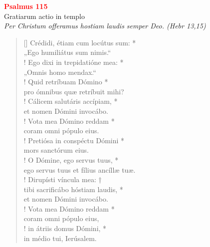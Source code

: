 
\def\greinitialformat#1{%
{\fontsize{39}{39}\selectfont #1}%
}




\vspace{0.3cm}
\begin{center}
 \textcolor{red}{\large \bf Psalmus 115}\\
Gratiarum actio in templo\\
\textit{\small Per Christum offeramus hostiam laudis semper Deo. (Hebr 13,15)}
\end{center}
\begin{verse}[\versewidth]
\vin  Crédidi, étiam cum locútus sum: *\\
\vin  „Ego humiliátus sum nimis.“\\!
Ego dixi in trepidatióne mea: *\\
„Omnis homo mendax.“\\!
\vin  Quid retríbuam Dómino *\\
\vin  pro ómnibus quæ retríbuit mihi?\\!
Cálicem salutáris accípiam, *\\
et nomen Dómini invocábo.\\!
\vin  Vota mea Dómino reddam *\\
\vin  coram omni pópulo eius.\\!
Pretiósa in conspéctu Dómini *\\
mors sanctórum eius.\\!
\vin  O Dómine, ego servus tuus, *\\
\vin  ego servus tuus et fílius ancíllæ tuæ.\\!
Dirupísti víncula mea: †\\
tibi sacrificábo hóstiam laudis, *\\
et nomen Dómini invocábo.\\!
\vin  Vota mea Dómino reddam *\\
\vin  coram omni pópulo eius,\\!
in átriis domus Dómini, *\\
in médio tui, Ierúsalem.
\end{verse}
\vspace{1cm}